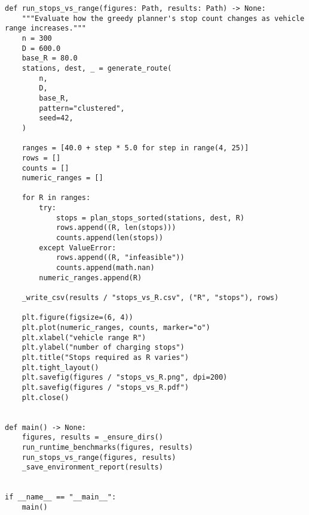 \begin{lstlisting}[caption={Benchmark and plotting harness},label={lst:ev-benchmark}]
def run_stops_vs_range(figures: Path, results: Path) -> None:
    """Evaluate how the greedy planner's stop count changes as vehicle range increases."""
    n = 300
    D = 600.0
    base_R = 80.0
    stations, dest, _ = generate_route(
        n,
        D,
        base_R,
        pattern="clustered",
        seed=42,
    )

    ranges = [40.0 + step * 5.0 for step in range(4, 25)]
    rows = []
    counts = []
    numeric_ranges = []

    for R in ranges:
        try:
            stops = plan_stops_sorted(stations, dest, R)
            rows.append((R, len(stops)))
            counts.append(len(stops))
        except ValueError:
            rows.append((R, "infeasible"))
            counts.append(math.nan)
        numeric_ranges.append(R)

    _write_csv(results / "stops_vs_R.csv", ("R", "stops"), rows)

    plt.figure(figsize=(6, 4))
    plt.plot(numeric_ranges, counts, marker="o")
    plt.xlabel("vehicle range R")
    plt.ylabel("number of charging stops")
    plt.title("Stops required as R varies")
    plt.tight_layout()
    plt.savefig(figures / "stops_vs_R.png", dpi=200)
    plt.savefig(figures / "stops_vs_R.pdf")
    plt.close()


def main() -> None:
    figures, results = _ensure_dirs()
    run_runtime_benchmarks(figures, results)
    run_stops_vs_range(figures, results)
    _save_environment_report(results)


if __name__ == "__main__":
    main()
\end{lstlisting}
